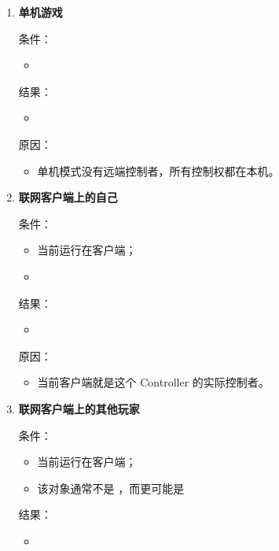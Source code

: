 \begin{enumerate}
	\item \textbf{单机游戏}
	
	条件：
	\begin{itemize}
		\item {}
	\end{itemize}
	
	结果：
	\begin{itemize}
		\item {}
	\end{itemize}
	
	原因：
	\begin{itemize}
		\item 单机模式没有远端控制者，所有控制权都在本机。
	\end{itemize}
	
	\item \textbf{联网客户端上的自己}
	
	条件：
	\begin{itemize}
		\item 当前运行在客户端；
		\item {}
	\end{itemize}
	
	结果：
	\begin{itemize}
		\item {}
	\end{itemize}
	
	原因：
	\begin{itemize}
		\item 当前客户端就是这个 Controller 的实际控制者。
	\end{itemize}
	
	\item \textbf{联网客户端上的其他玩家}
	
	条件：
	
	\begin{itemize}
		\item 当前运行在客户端；
		\item 该对象通常不是 ，而更可能是 
	\end{itemize}
	
	结果：
	
	\begin{itemize}
		\item {}
	\end{itemize}
	

\end{enumerate}
